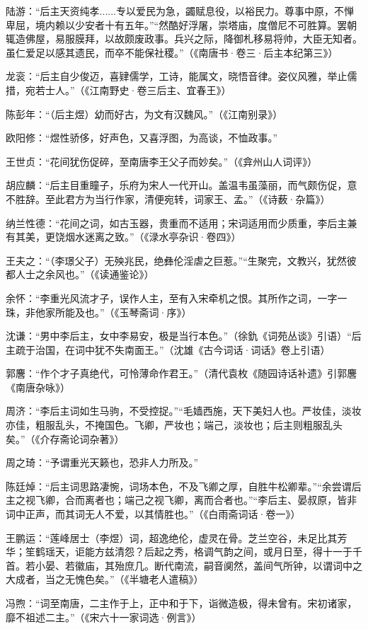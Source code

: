 陆游：“后主天资纯孝......专以爱民为急，蠲赋息役，以裕民力。尊事中原，不惮卑屈，境内赖以少安者十有五年。”“然酷好浮屠，崇塔庙，度僧尼不可胜算。罢朝辄造佛屋，易服膜拜，以故颇废政事。兵兴之际，降御札移易将帅，大臣无知者。虽仁爱足以感其遗民，而卒不能保社稷。”（《南唐书·卷三·后主本纪第三》）

龙衮：“后主自少俊迈，喜肄儒学，工诗，能属文，晓悟音律。姿仪风雅，举止儒措，宛若士人。”（《江南野史·卷三后主、宜春王》）

陈彭年：“（后主煜）幼而好古，为文有汉魏风。”（《江南别录》）

欧阳修：“煜性骄侈，好声色，又喜浮图，为高谈，不恤政事。”

王世贞：“花间犹伤促碎，至南唐李王父子而妙矣。”（《弇州山人词评》）

胡应麟：“后主目重瞳子，乐府为宋人一代开山。盖温韦虽藻丽，而气颇伤促，意不胜辞。至此君方为当行作家，清便宛转，词家王、孟。”（《诗薮·杂篇》）

纳兰性德：“花间之词，如古玉器，贵重而不适用；宋词适用而少质重，李后主兼有其美，更饶烟水迷离之致。”（《渌水亭杂识·卷四》）

王夫之：“（李璟父子）无殃兆民，绝彝伦淫虐之巨惹。”“生聚完，文教兴，犹然彼都人士之余风也。”（《读通鉴论》）

余怀：“李重光风流才子，误作人主，至有入宋牵机之恨。其所作之词，一字一珠，非他家所能及也。”（《玉琴斋词·序》）

沈谦：“男中李后主，女中李易安，极是当行本色。”（徐釚《词苑丛谈》引语）“后主疏于治国，在词中犹不失南面王。”（沈雄《古今词话·词话》卷上引语）

郭麐：“作个才子真绝代，可怜薄命作君王。”（清代袁枚《随园诗话补遗》引郭麐《南唐杂咏》）

周济：“李后主词如生马驹，不受控捉。”“毛嫱西施，天下美妇人也。严妆佳，淡妆亦佳，粗服乱头，不掩国色。飞卿，严妆也；端己，淡妆也；后主则粗服乱头矣。”（《介存斋论词杂著》）

周之琦：“予谓重光天籁也，恐非人力所及。”

陈廷焯：“后主词思路凄惋，词场本色，不及飞卿之厚，自胜牛松卿辈。”“余尝谓后主之视飞卿，合而离者也；端己之视飞卿，离而合者也。”“李后主、晏叔原，皆非词中正声，而其词无人不爱，以其情胜也。”（《白雨斋词话·卷一》）

王鹏运：“莲峰居士（李煜）词，超逸绝伦，虚灵在骨。芝兰空谷，未足比其芳华；笙鹤瑶天，讵能方兹清怨？后起之秀，格调气韵之间，或月日至，得十一于千首。若小晏、若徽庙，其殆庶几。断代南流，嗣音阒然，盖间气所钟，以谓词中之大成者，当之无愧色矣。”（《半塘老人遣稿》）

冯煦：“词至南唐，二主作于上，正中和于下，诣微造极，得未曾有。宋初诸家，靡不祖述二主。”（《宋六十一家词选·例言》）

